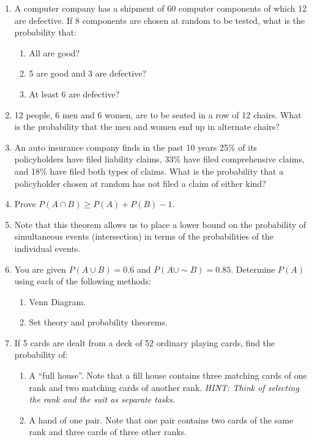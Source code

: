 \documentclass{article}
\newcommand{\comp}{{\sim}}						%
\begin{document}
\begin{enumerate}
    \item A computer company has a shipment of 60 computer components of which 12 are defective. If 8 components are chosen at random to be tested, what is the probability that:
    \begin{enumerate}
        \item All are good?
        \item 5 are good and 3 are defective?
        \item At least 6 are defective?%
    \end{enumerate}\bigskip%
    
    \item 12 people, 6 men and 6 women, are to be seated in a row of 12 chairs. What is the probability that the men and women end up in alternate chairs?\bigskip%
    
    \item An auto insurance company finds in the past 10 years 25\% of its policyholders have filed liability claims, 33\% have filed comprehensive claims, and 18\% have filed both types of claims. What is the probability that a policyholder chosen at random has not filed a claim of either kind?\bigskip%
    
    \item Prove $P(A \cap B) \ge P(A) + P(B) - 1.$%
    \item[] Note that this theorem allows us to place a lower bound on the probability of simultaneous events (intersection) in terms of the probabilities of the individual events.\bigskip
    \item You are given $P(A \cup B) = 0.6$ and $P(A \cup \comp B) = 0.85.$ Determine $P(A)$ using each of the following methods:%
    \begin{enumerate}
        \item Venn Diagram.
        \item Set theory and probability theorems.
    \end{enumerate}\bigskip
    
    \item If 5 cards are dealt from a deck of 52 ordinary playing cards, find the probability of:%
    \begin{enumerate}
        \item A ``full house''. Note that a fill house contains three matching cards of one rank and two matching cards of another rank. \textit{HINT: Think of selecting the rank and the suit as separate tasks.}
        \item A hand of one pair. Note that one pair contains two cards of the same rank and three cards of three other ranks.
    \end{enumerate} 
\end{enumerate}
\end{document}
